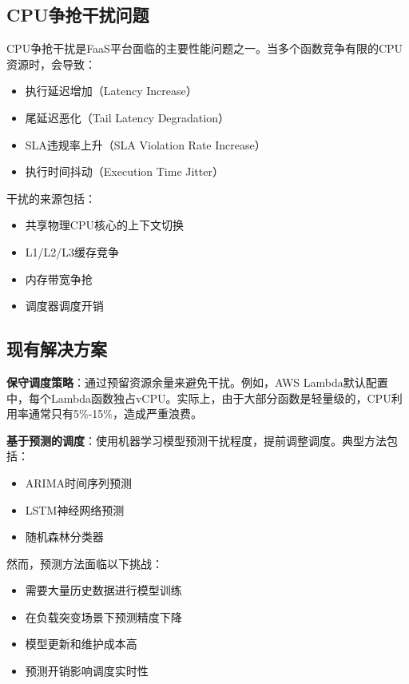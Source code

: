\documentclass[11pt, a4paper, oneside]{article}
\begin{document}
\subsection{CPU争抢干扰问题}

CPU争抢干扰是FaaS平台面临的主要性能问题之一\citep{op cit,jung2018performance}。当多个函数竞争有限的CPU资源时，会导致：

\begin{itemize}
    \item 执行延迟增加（Latency Increase）
    \item 尾延迟恶化（Tail Latency Degradation）
    \item SLA违规率上升（SLA Violation Rate Increase）
    \item 执行时间抖动（Execution Time Jitter）
\end{itemize}

干扰的来源包括：
\begin{itemize}
    \item 共享物理CPU核心的上下文切换
    \item L1/L2/L3缓存竞争
    \item 内存带宽争抢
    \item 调度器调度开销
\end{itemize}

\subsection{现有解决方案}

\textbf{保守调度策略}：通过预留资源余量来避免干扰。例如，AWS Lambda默认配置中，每个Lambda函数独占vCPU。实际上，由于大部分函数是轻量级的，CPU利用率通常只有5\%-15\%，造成严重浪费。

\textbf{基于预测的调度}：使用机器学习模型预测干扰程度，提前调整调度。典型方法包括：
\begin{itemize}
    \item ARIMA时间序列预测\citep{zhang2020prediction}
    \item LSTM神经网络预测\citep{shen2019interference}
    \item 随机森林分类器\citep{jung2018performance}
\end{itemize}

然而，预测方法面临以下挑战：
\begin{itemize}
    \item 需要大量历史数据进行模型训练
    \item 在负载突变场景下预测精度下降
    \item 模型更新和维护成本高
    \item 预测开销影响调度实时性
\end{itemize}
\end{document}
